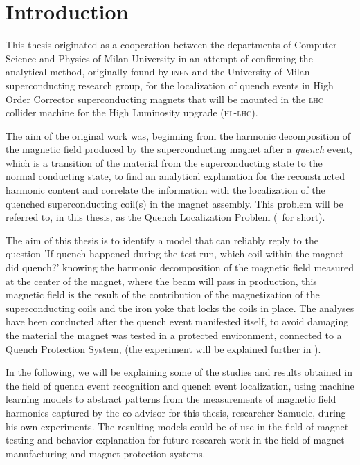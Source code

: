 \chapter{Introduction}
This thesis originated as a cooperation between the departments of Computer Science and Physics of
Milan University in an attempt of confirming the analytical method, originally found by
\textsc{infn} and the University of Milan superconducting research group, for the localization of
quench events in High Order Corrector superconducting magnets \cite{mariotto2022}
\cite{mariotto2022-generic} that will be mounted in the \textsc{lhc} collider machine for the High
Luminosity upgrade \cite{rossi2024} (\textsc{hl-lhc}).

The aim of the original work was, beginning from the harmonic decomposition of the magnetic
field produced by the superconducting magnet after a \emph{quench} event, which is a transition of the
material from the superconducting state to the normal conducting state, to find an analytical
explanation for the reconstructed harmonic content and correlate the information with the
localization of the quenched superconducting coil(s) in the magnet assembly. This problem will be
referred to, in this thesis, as the Quench Localization Problem (\qlp\ for short).

The aim of this thesis is to identify a model that can reliably reply to the question 'If quench
happened during the test run, which coil within the magnet did quench?' knowing the harmonic
decomposition of the magnetic field measured at the center of the magnet, where the beam will pass
in production, this magnetic field is the result of the contribution of the magnetization of the
superconducting coils and the iron yoke that locks the coils in place. The analyses have been
conducted after the quench event manifested itself, to avoid damaging the material the magnet was
tested in a protected environment, connected to a Quench Protection System, (the experiment will be
explained further in ).

In the following, we will be explaining some of the studies and results obtained in the field of
quench event recognition and quench event localization, using machine learning models to abstract
patterns from the measurements of magnetic field harmonics captured by the co-advisor for this
thesis, researcher Samuele, during his own experiments. The resulting models could be of use in the
field of magnet testing and behavior explanation for future research work in the field of magnet
manufacturing and magnet protection systems.

